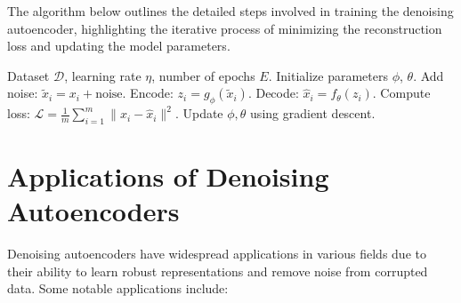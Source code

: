 \documentclass[a4paper,12pt]{article}
\begin{document}
\raggedright
The algorithm below outlines the detailed steps involved in training the denoising autoencoder, highlighting the iterative process of minimizing the reconstruction loss and updating the model parameters.

\begin{algorithm}
\caption{Training a Denoising Autoencoder}
\begin{algorithmic}[1]
\Require Dataset $\mathcal{D}$, learning rate $\eta$, number of epochs $E$.
\State Initialize parameters $\phi$, $\theta$.
        \State Add noise: $\tilde{x}_i = x_i + \text{noise}$.
        \State Encode: $z_i = g_\phi(\tilde{x}_i)$.
        \State Decode: $\hat{x}_i = f_\theta(z_i)$.
        \State Compute loss: $\mathcal{L} = \frac{1}{m} \sum_{i=1}^m \|x_i - \hat{x}_i\|^2$.
        \State Update $\phi, \theta$ using gradient descent.
    \EndFor
\EndFor
\end{algorithmic}
\end{algorithm}
\raggedright
\section{Applications of Denoising Autoencoders}

Denoising autoencoders have widespread applications in various fields due to their ability to learn robust representations and remove noise from corrupted data. Some notable applications include:
\end{document}
